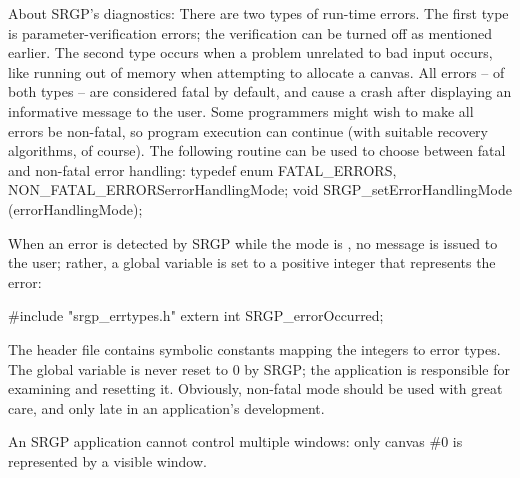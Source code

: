 
\newpar
About SRGP's diagnostics: There are two types of run-time errors.  The first
type is parameter-verification errors; the verification can be turned off as
mentioned earlier.  The second type occurs when a problem unrelated to bad
input occurs, like running out of memory when attempting to allocate a canvas.
All errors -- of both types -- are considered fatal by default, and cause a
crash after displaying an informative message to the user.  Some programmers
might wish to make all errors be non-fatal, so program execution can continue
(with suitable recovery algorithms, of course).  The following routine
can be used to choose between fatal and non-fatal error handling:
\begincode
typedef enum \lb{}FATAL_ERRORS, NON_FATAL_ERRORS\rb errorHandlingMode;
void SRGP_setErrorHandlingMode (errorHandlingMode);
\endcode

\newpar
When an error is detected by SRGP while the mode is ,
no message is issued to the user; rather, a 
global variable is set to a positive integer that represents the error:

\begincode
#include "srgp_errtypes.h"
extern int SRGP_errorOccurred;
\endcode

\newpar
The header file contains symbolic constants mapping the integers to error
types.  The global variable is never reset to 0 by SRGP; the application is
responsible for examining and resetting it.  Obviously, non-fatal mode should
be used with great care, and only late in an application's development.



An SRGP application cannot control multiple windows: only canvas \#0 is
represented by a visible window.  



